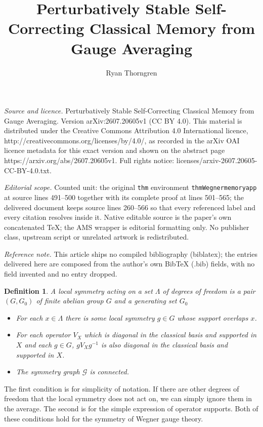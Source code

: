 \documentclass[10pt,a4paper]{amsart}
\newtheorem{defin}{Definition}
\begin{document}
\title[Perturbatively Stable Self-Correcting Classical Memory from ]{Perturbatively Stable Self-Correcting Classical Memory from Gauge Averaging}
\author{Ryan Thorngren}
\date{}
\maketitle
\noindent\emph{Source and licence.} Perturbatively Stable Self-Correcting Classical Memory from Gauge Averaging. Version arXiv:2607.20605v1 (CC BY 4.0). This material is distributed under the Creative Commons Attribution 4.0 International licence, http://creativecommons.org/licenses/by/4.0/, as recorded in the arXiv OAI licence metadata for this exact version and shown on the abstract page https://arxiv.org/abs/2607.20605v1. Full rights notice: licenses/arxiv-2607.20605-CC-BY-4.0.txt.\par\smallskip
\noindent\textit{Editorial scope.} Counted unit: the original \texttt{thm} environment \texttt{thmWegnermemoryapp} at source lines 491--500 together with its complete proof at lines 501--565; the delivered document keeps source lines 260--566 so that every referenced label and every citation resolves inside it. Native editable source is the paper's own concatenated TeX; the AMS wrapper is editorial formatting only. No publisher class, upstream script or unrelated artwork is redistributed.
\par\smallskip\noindent\textit{Reference note.} This article ships no compiled bibliography (biblatex); the entries delivered here are composed from the author's own BibTeX (.bib) fields, with no field invented and no entry dropped.
\begin{defin}\label{deflocalsymmetry}
    A local symmetry acting on a set $\Lambda$ of degrees of freedom is a pair $(G,G_0)$ of finite abelian group $G$ and a generating set $G_0$
    \begin{itemize}
        \item For each $x \in \Lambda$ there is some local symmetry $g \in G$ whose support overlaps $x$.
        \item For each operator $V_X$ which is diagonal in the classical basis and supported in $X$ and each $g \in G$, $g V_X g^{-1}$ is also diagonal in the classical basis and supported in $X$.
        \item The symmetry graph $\mathcal{G}$ is connected.
    \end{itemize}
\end{defin}
The first condition is for simplicity of notation. If there are other degrees of freedom that the local symmetry does not act on, we can simply ignore them in the average. The second is for the simple expression of operator supports. Both of these conditions hold for the symmetry of Wegner gauge theory.
\end{document}
